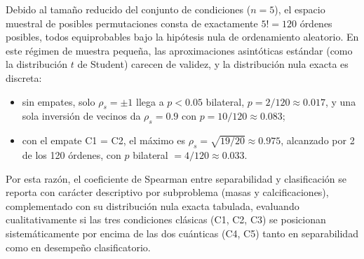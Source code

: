 Debido al tamaño reducido del conjunto de condiciones ($n = 5$), el espacio muestral de posibles
permutaciones consta de exactamente $5! = 120$ órdenes posibles, todos equiprobables bajo la hipótesis
nula de ordenamiento aleatorio. En este régimen de muestra pequeña, las aproximaciones asintóticas
estándar (como la distribución $t$ de Student) carecen de validez, y la distribución nula exacta es
discreta:
\begin{itemize}
  \item sin empates, solo $\rho_s=\pm1$ llega a $p<0.05$ bilateral, $p = 2/120 \approx 0.017$, y una sola inversión de vecinos da $\rho_s = 0.9$ con $p = 10/120 \approx 0.083$;
  \item con el empate C1 = C2, el máximo es $\rho_s=\sqrt{19/20}\approx0.975$, alcanzado por 2 de los 120 órdenes, con $p$ bilateral $= 4/120 \approx 0.033$.
\end{itemize}
Por esta razón, el coeficiente de Spearman entre separabilidad y clasificación se reporta con
carácter descriptivo por subproblema (masas y calcificaciones), complementado con su
distribución nula exacta tabulada, evaluando cualitativamente si las
tres condiciones clásicas (C1, C2, C3) se posicionan sistemáticamente por encima de las dos
cuánticas (C4, C5) tanto en separabilidad como en desempeño clasificatorio.
